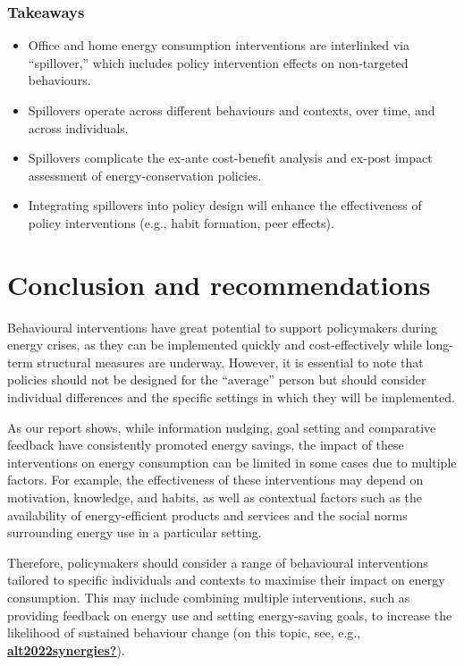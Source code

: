 \documentclass[
  11pt,
]{article}
\begin{document}
\hypertarget{takeaways-1}{%
\subsubsection*{Takeaways}\label{takeaways-1}}

\begin{itemize}
\item
  Office and home energy consumption interventions are interlinked via
  ``spillover,'' which includes policy intervention effects on
  non-targeted behaviours.
\item
  Spillovers operate across different behaviours and contexts, over
  time, and across individuals.
\item
  Spillovers complicate the ex-ante cost-benefit analysis and ex-post
  impact assessment of energy-conservation policies.
\item
  Integrating spillovers into policy design will enhance the
  effectiveness of policy interventions (e.g., habit formation, peer
  effects).
\end{itemize}

\hypertarget{conclusion}{%
\section{Conclusion and recommendations}\label{conclusion}}

Behavioural interventions have great potential to support policymakers
during energy crises, as they can be implemented quickly and
cost-effectively while long-term structural measures are underway.
However, it is essential to note that policies should not be designed
for the ``average'' person but should consider individual differences
and the specific settings in which they will be implemented.

As our report shows, while information nudging, goal setting and
comparative feedback have consistently promoted energy savings, the
impact of these interventions on energy consumption can be limited in
some cases due to multiple factors. For example, the effectiveness of
these interventions may depend on motivation, knowledge, and habits, as
well as contextual factors such as the availability of energy-efficient
products and services and the social norms surrounding energy use in a
particular setting.

Therefore, policymakers should consider a range of behavioural
interventions tailored to specific individuals and contexts to maximise
their impact on energy consumption. This may include combining multiple
interventions, such as providing feedback on energy use and setting
energy-saving goals, to increase the likelihood of sustained behaviour
change (on this topic, see, e.g.,
\protect\hyperlink{ref-alt2022synergies}{\textbf{alt2022synergies?}}).
\end{document}
